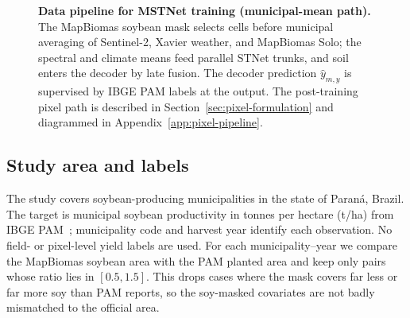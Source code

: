 \begin{figure}[!htbp]
{%
}
\caption{\textbf{Data pipeline for MSTNet training (municipal-mean path).}
The MapBiomas soybean mask selects cells before municipal averaging of Sentinel-2, Xavier weather, and MapBiomas Solo; the spectral and climate means feed parallel STNet trunks, and soil enters the decoder by late fusion. The decoder prediction $\hat{y}_{m,y}$ is supervised by IBGE PAM labels at the output.
The post-training pixel path is described in Section~\ref{sec:pixel-formulation} and diagrammed in Appendix~\ref{app:pixel-pipeline}.}
\label{fig:data-flow}
\end{figure}

\subsection{Study area and labels}
The study covers soybean-producing municipalities in the state of Paran\'{a}, Brazil.
The target is municipal soybean productivity in tonnes per hectare (\si{t/ha}) from IBGE PAM~\citep{ibgepam}; municipality code and harvest year identify each observation.
No field- or pixel-level yield labels are used.
For each municipality--year we compare the MapBiomas soybean area with the PAM planted area and keep only pairs whose ratio lies in $[0.5, 1.5]$.
This drops cases where the mask covers far less or far more soy than PAM reports, so the soy-masked covariates are not badly mismatched to the official area.

